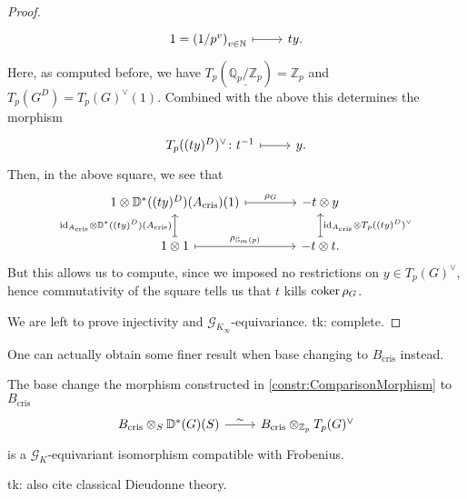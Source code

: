 \begin{proof}
\begin{equation*}
\begin{tikzcd}[row sep = 0ex
		,/tikz/column 1/.append style={anchor=base east}
		,/tikz/column 2/.append style={anchor=base west}]
		1 = \left( 1/p^v \right)_{v \in \mathbb{N}}
		\arrow[r, "", mapsto] &
		ty
	.\end{tikzcd}
	\end{equation*} 
	Here, as computed before, we have $T_p ( \underline{\mathbb{Q}_p/\mathbb{Z}_{p}} ) =
	\mathbb{Z}_{p}$ and $T_p(G^D) = T_p(G)^\vee(1)$.
	Combined with the above this determines the morphism
	\begin{equation*}
	\begin{tikzcd}[row sep = 0ex
		,/tikz/column 1/.append style={anchor=base east}
		,/tikz/column 2/.append style={anchor=base west}]
		T_p((ty)^D)^\vee\colon 
		t^{-1}
		\arrow[r, "", mapsto] &
		y
	.\end{tikzcd}
	\end{equation*}
	Then, in the above square, we see that
	\begin{equation*}
	\begin{tikzcd}[column sep=4em]
		1 \otimes \mathbb{D}^*((ty)^D)(A_{\mathrm{cris}})(1) 
		\arrow[r, "\rho_G", mapsto] &
		-t \otimes y \\
		1 \otimes 1
		\arrow[u, "\mathrm{id}_{ A_{\mathrm{cris}} } \otimes \mathbb{D}^*((ty)^D)(A_{\mathrm{cris}})", mapsto] 
		\arrow[r, "\rho_{\mathbb{G}_m(p)}", mapsto] &
		-t \otimes t
		\arrow[u, "\mathrm{id}_{ A_{\mathrm{cris}} } \otimes T_p((ty)^D)^\vee"', mapsto] 
	.\end{tikzcd}
	\end{equation*}
	But this allows us to compute, since we imposed no restrictions
	on $y \in T_p(G)^\vee$, hence commutativity of the square
	tells us that $t$ kills $\operatorname{coker} \rho_G$.

	We are left to prove injectivity and $\mathscr{G}_{K_\infty}$-equivariance.
	tk: complete.
\end{proof}


\noindent
One can actually obtain some finer result when base changing to $B_{\mathrm{cris}}$
instead.
\begin{thm}[]
	The base change the morphism
	constructed in \cref{constr:ComparisonMorphism} to $B_{\mathrm{cris}}$
	\begin{equation*}
	\begin{tikzcd}[row sep = 0ex
		,/tikz/column 1/.append style={anchor=base east}
		,/tikz/column 2/.append style={anchor=base west}]
		B_{\mathrm{cris}} \otimes_S \mathbb{D}^*(G)(S) \arrow[r, "\sim", rightarrow] &
		B_{\mathrm{cris}} \otimes_{\mathbb{Z}_{p}} T_p(G)^\vee
	\end{tikzcd}
	\end{equation*} 
	is a $\mathscr{G}_K$-equivariant isomorphism compatible with Frobenius.
\end{thm}


tk: also cite classical Dieudonne theory.
